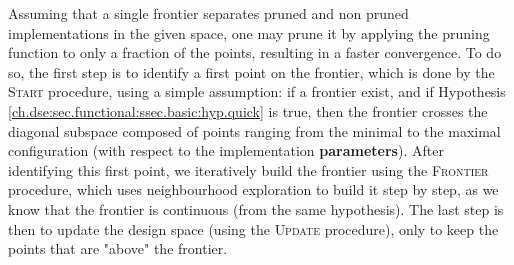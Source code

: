         Assuming that a single frontier separates pruned and non pruned implementations in the given space, one may prune it by applying the pruning function to only a fraction of the points, resulting in a faster convergence.
        To do so, the first step is to identify a first point on the frontier, which is done by the \textsc{Start} procedure, using a simple assumption: if a frontier exist, and if Hypothesis \ref{ch.dse:sec.functional:ssec.basic:hyp.quick} is true, then the frontier crosses the diagonal subspace composed of points ranging from the minimal to the maximal configuration (with respect to the implementation {\bf parameters}).
        After identifying this first point, we iteratively build the frontier using the \textsc{Frontier} procedure, which uses neighbourhood exploration to build it step by step, as we know that the frontier is continuous (from the same hypothesis).
        The last step is then to update the design space (using the \textsc{Update} procedure), only to keep the points that are "above" the frontier.

